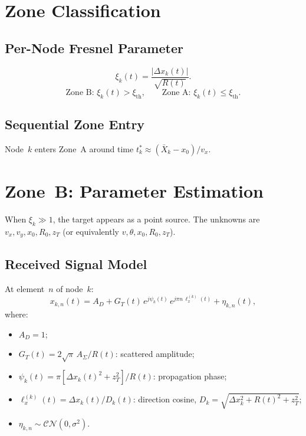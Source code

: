 \documentclass[11pt,a4paper]{article}
\begin{document}
\section{Zone Classification}
\label{sec:zones}

\subsection{Per-Node Fresnel Parameter}
\begin{equation}
  \xi_k(t) = \frac{|\Delta x_k(t)|}{\sqrt{R(t)}}.
  \label{eq:xi_k}
\end{equation}
\begin{equation}
  \text{Zone~B: } \xi_k(t)>\xi_{\mathrm{th}},
  \qquad
  \text{Zone~A: } \xi_k(t)\le\xi_{\mathrm{th}}.
  \label{eq:zone_def}
\end{equation}

\subsection{Sequential Zone Entry}
Node~$k$ enters Zone~A around time
$t_k^*\approx(\bar{X}_k-x_0)/v_x$.

\section{Zone~B: Parameter Estimation}
\label{sec:zone_b}

When $\xi_k\gg 1$, the target appears as a point source.  The
unknowns are $v_x,v_y,x_0,R_0,z_T$
(or equivalently $v,\theta,x_0,R_0,z_T$).

\subsection{Received Signal Model}
\label{sec:zone_b_signal}

At element~$n$ of node~$k$:
\begin{equation}
  x_{k,n}(t) = A_D + G_T(t)\,e^{j\psi_k(t)}\,
  e^{j\pi n\,\ell_x^{(k)}(t)} + \eta_{k,n}(t),
  \label{eq:rx_signal}
\end{equation}
where:
\begin{itemize}
  \item $A_D=1$;
  \item $G_T(t) = 2\sqrt{\pi}\,A_\Sigma / R(t)$: scattered
    amplitude;
  \item $\psi_k(t) = \pi[\Delta x_k(t)^2{+}z_T^2]/R(t)$:
    propagation phase;
  \item $\ell_x^{(k)}(t) = \Delta x_k(t)/D_k(t)$: direction cosine,
    $D_k=\sqrt{\Delta x_k^2+R(t)^2+z_T^2}$;
  \item $\eta_{k,n}\sim\mathcal{CN}(0,\sigma^2)$.
\end{itemize}
\end{document}
